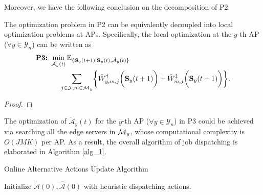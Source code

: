 Moreover, we have the following conclusion on the decomposition of P2.
\begin{lemma}[]
    The optimization problem in P2 can be equivalently decoupled into local optimization problems at APs.
    Specifically, the local optimization at the $y$-th AP ($\forall y\in\mathcal{Y}_{n}$) can be written as
    {\small
    \begin{align}
        \textbf{P3:}~
        &\min_{ \tilde{\mathcal{A}}_{y}(t) }
        \mathbb{E}_{\set{ \Stat_{y}(t+1)|\Stat_{y}(t), \tilde{\mathcal{A}}_{y}(t) }}
        \nonumber\\
        &~~~~\sum_{j\in\jSpace,m\in\esSet_{y}} \Brace{
            \tilde{W}^{\AP}_{y,m,j}\Paren{\Stat_{y}(t+1)}
            +\tilde{W}^{\ES}_{m,j}\Paren{\Stat_{y}(t+1)}
        }.
        \label{eqn:partial}
    \end{align}
    }
    \label{lemma:w_partial}
\end{lemma}
\begin{proof}
\end{proof}

The optimization of $\tilde{\mathcal{A}}_{y}(t)$ for the $y$-th AP ($\forall y\in\mathcal{Y}_{n}$) in P3 could be achieved via searching all the edge servers in $\mathcal{M}_{y}$, whose computational complexity is $O(JMK)$ per AP. %
As a result, the overall algorithm of job dispatching is elaborated in Algorithm \ref{alg_1}.
\begin{algorithm}[ht]
    \caption{Online Alternative Actions Update Algorithm}\label{alg_1}
    \DontPrintSemicolon %
    Initialize $\tilde{\mathcal{A}}(0),\hat{\mathcal{A}}(0)$ with heuristic dispatching actions.\;
\end{algorithm}

